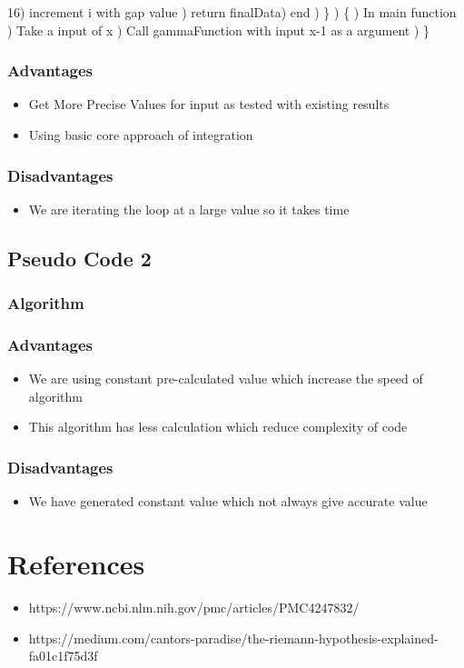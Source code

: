 \documentclass{article}
\begin{document}
16) \hspace{35pt} increment i with gap value ) \hspace{15pt} return finalData) end ) \} ) \{ ) In main function ) \hspace{15pt} Take a input of x ) \hspace{15pt} Call gammaFunction with input x-1 as a argument ) \}
\subsubsection{Advantages}
\begin{itemize}
\item Get More Precise Values for input as tested with existing results
\item Using basic core approach of integration
\end{itemize}
\subsubsection{Disadvantages}
\begin{itemize}
\item We are iterating the loop at a large value so it takes time
\end{itemize}
\subsection{Pseudo Code 2}
\subsubsection{Algorithm}
\subsubsection{Advantages}
\begin{itemize}
\item We are using constant pre-calculated value which increase the speed of algorithm
\item This algorithm has less calculation which reduce complexity of code
\end{itemize}
\subsubsection{Disadvantages}
\begin{itemize}
\item We have generated constant value which not always give accurate value
\end{itemize}


\section{References}
\begin{itemize}
\item https://www.ncbi.nlm.nih.gov/pmc/articles/PMC4247832/
\item https://medium.com/cantors-paradise/the-riemann-hypothesis-explained-fa01c1f75d3f
\end{itemize}
\end{document}
